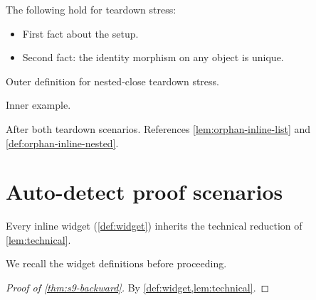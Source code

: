 \documentclass{article}
\begin{document}
\begin{lemma}\label{lem:orphan-inline-list}
The following hold for teardown stress:
\begin{itemize}
  \item First fact about the setup.
  \item Second fact: the identity morphism on any object is unique.
\end{itemize}
\end{lemma}

\begin{definition}\label{def:orphan-inline-nested}
Outer definition for nested-close teardown stress.
\begin{example}\label{ex:orphan-inline-nested}
Inner example.
\end{example}
\end{definition}

\begin{theorem}\label{thm:orphan-inline-after}
After both teardown scenarios.
References \cref{lem:orphan-inline-list} and \cref{def:orphan-inline-nested}.
\end{theorem}


\setcounter{section}{8}
\section{Auto-detect proof scenarios}
\label{sec:w05a1}

\begin{theorem}\label{thm:s9-backward}
Every inline widget (\cref{def:widget}) inherits the technical reduction
of \cref{lem:technical}.
\end{theorem}

We recall the widget definitions before proceeding.

\begin{proof}[Proof of \cref{thm:s9-backward}]
By \cref{def:widget,lem:technical}.
\end{proof}
\end{document}
